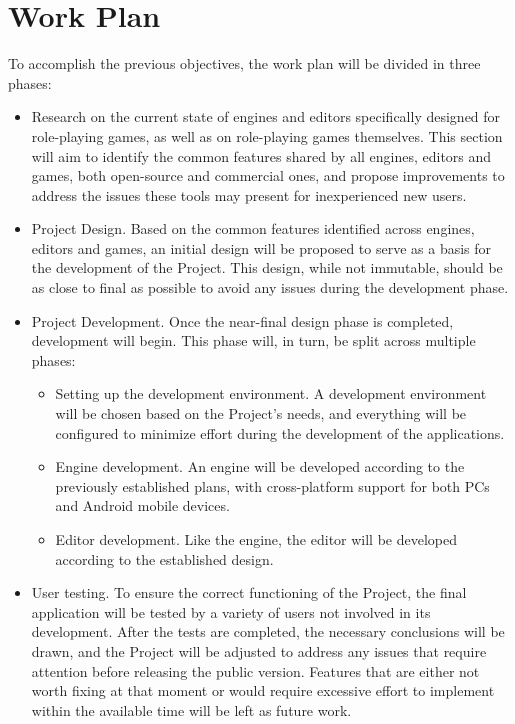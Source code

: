 \section*{Work Plan}
To accomplish the previous objectives, the work plan will be divided in three phases: 
\begin{itemize}
	\item Research on the current state of engines and editors specifically designed for role-playing games, as well as on role-playing games themselves. This section will aim to identify the common features shared by all engines, editors and games, both open-source and commercial ones, and propose improvements to address the issues these tools may present for inexperienced new users. 
	\item Project Design. Based on the common features identified across engines, editors and games, an initial design will be proposed to serve as a basis for the development of the Project. This design, while not immutable, should be as close to final as possible to avoid any issues during the development phase.
	\item Project Development. Once the near-final design phase is completed, development will begin. This phase will, in turn, be split across multiple phases:
		\begin{itemize}
			\item Setting up the development environment. A development environment will be chosen based on the Project's needs, and everything will be configured to minimize effort during the development of the applications.
			\item Engine development. An engine will be developed according to the previously established plans, with cross-platform support for both PCs and Android mobile devices.
			\item Editor development. Like the engine, the editor will be developed according to the established design.
		\end{itemize}
	\item User testing. To ensure the correct functioning of the Project, the final application will be tested by a variety of users not involved in its development. After the tests are completed, the necessary conclusions will be drawn, and the Project will be adjusted to address any issues that require attention before releasing the public version. Features that are either not worth fixing at that moment or would require excessive effort to implement within the available time will be left as future work.
\end{itemize}


